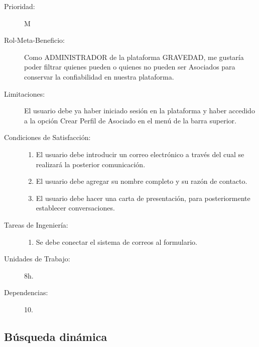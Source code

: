 \begin{description}
    \item[Prioridad:] M
    \item[Rol-Meta-Beneficio:] Como ADMINISTRADOR de la plataforma GRAVEDAD, me gustaría poder filtrar quienes pueden o quienes no pueden ser Asociados para conservar la confiabilidad en nuestra plataforma.
    \item[Limitaciones:]  El usuario debe ya haber iniciado sesión en la plataforma y haber accedido a la opción Crear Perfil de Asociado en el menú de la barra superior.
    \item[Condiciones de Satisfacción:]  \hfill
        \begin{enumerate}
            \item El usuario debe introducir un correo electrónico a través del cual se realizará la posterior comunicación.
    		\item El usuario debe agregar su nombre completo y su razón de contacto.
    		\item El usuario debe hacer una carta de presentación, para posteriormente establecer conversaciones.
        \end{enumerate}
    \item[Tareas de Ingeniería:]  \hfill
        \begin{enumerate}
            \item Se debe conectar el sistema de correos al formulario.
        \end{enumerate}
    \item[Unidades de Trabajo:] 8h.
    \item[Dependencias:] 10.
\end{description}

\newpage


\subsection{Búsqueda dinámica}

